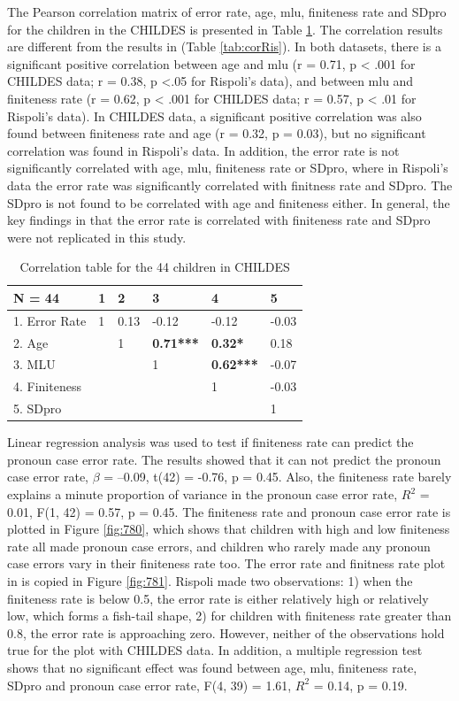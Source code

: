The Pearson correlation matrix of error rate, age, mlu, finiteness rate and SDpro for the children in the CHILDES is presented in Table \ref{tab:my80}. The correlation results are different from the results in \cite{rispoli2005} (Table \ref{tab:corRis}). In both datasets, there is a significant positive correlation between age and mlu (r = 0.71, p < .001 for CHILDES data; r = 0.38, p <.05 for Rispoli's data), and between mlu and finiteness rate  (r = 0.62, p < .001 for CHILDES data; r = 0.57, p < .01 for Rispoli's data). In CHILDES data, a significant positive correlation was also found between finiteness rate and age (r = 0.32, p = 0.03),  but no significant correlation was found in Rispoli's data. In addition, the error rate is not significantly correlated with age, mlu, finiteness rate or SDpro, where in Rispoli's data the error rate was significantly correlated with finitness rate and SDpro. The SDpro is not found to be correlated with age and finiteness either. In general, the key findings in \cite{rispoli2005} that the error rate is correlated with finiteness rate and SDpro were not replicated in this study. 
\FloatBarrier
\begin{table}[!h]
\centering
\caption{Correlation table for the 44 children in CHILDES}
\label{tab:my80}
\begin{tabular}{llllll}
\toprule
N = 44 & 1 & 2 & 3 & 4 & 5 \\
 \hline
1. Error Rate & 1 & 0.13 & -0.12 & -0.12 & -0.03 \\
2. Age &  & 1 & \textbf{0.71***} & \textbf{0.32*} & 0.18 \\
3. MLU &  &  & 1 & \textbf{0.62***} & -0.07 \\
4. Finiteness &  &  &  & 1 & -0.03 \\
5. SDpro &  &  &  &  & 1\\
\bottomrule
\end{tabular}
\end{table}
\FloatBarrier

Linear regression analysis was used to test if finiteness rate can predict the pronoun case error rate. The results showed that it can not predict the pronoun case error rate, $\beta$ = –0.09, t(42) = -0.76, p = 0.45. Also, the finiteness rate barely explains a minute proportion of variance in the pronoun case error rate, $R^2$ = 0.01, F(1, 42) = 0.57, p = 0.45. The finiteness rate and pronoun case error rate is plotted in Figure \ref{fig:780}, which shows that children with high and low finiteness rate all made pronoun case errors, and children who rarely made any pronoun case errors vary in their finiteness rate too. The error rate and finitness rate plot in \cite{rispoli2005} is copied in Figure \ref{fig:781}. Rispoli made two observations: 1) when the finiteness rate is below 0.5, the error rate is either relatively high or relatively low, which forms a fish-tail shape, 2) for children with finiteness rate greater than 0.8, the error rate is approaching zero. However, neither of the observations hold true for the plot with CHILDES data. In addition, a multiple regression test shows that no significant effect was found between age, mlu, finiteness rate, SDpro and pronoun case error rate, F(4, 39) = 1.61, $R^2$ = 0.14, p = 0.19.  

